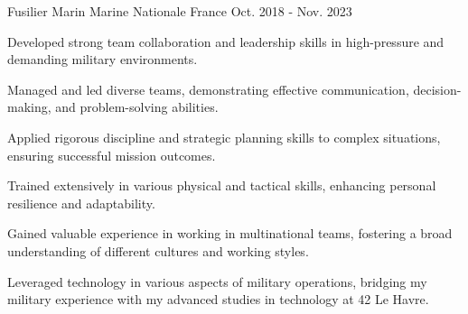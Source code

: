 \begin{cventries}
  \cventry
    {Fusilier Marin} %
    {Marine Nationale} %
    {France} %
    {Oct. 2018 - Nov. 2023} %
    {
      \begin{cvitems} %
        \item {Developed strong team collaboration and leadership skills in high-pressure and demanding military environments.}
        \item {Managed and led diverse teams, demonstrating effective communication, decision-making, and problem-solving abilities.}
        \item {Applied rigorous discipline and strategic planning skills to complex situations, ensuring successful mission outcomes.}
        \item {Trained extensively in various physical and tactical skills, enhancing personal resilience and adaptability.}
        \item {Gained valuable experience in working in multinational teams, fostering a broad understanding of different cultures and working styles.}
        \item {Leveraged technology in various aspects of military operations, bridging my military experience with my advanced studies in technology at 42 Le Havre.}
      \end{cvitems}
    }

\end{cventries}
